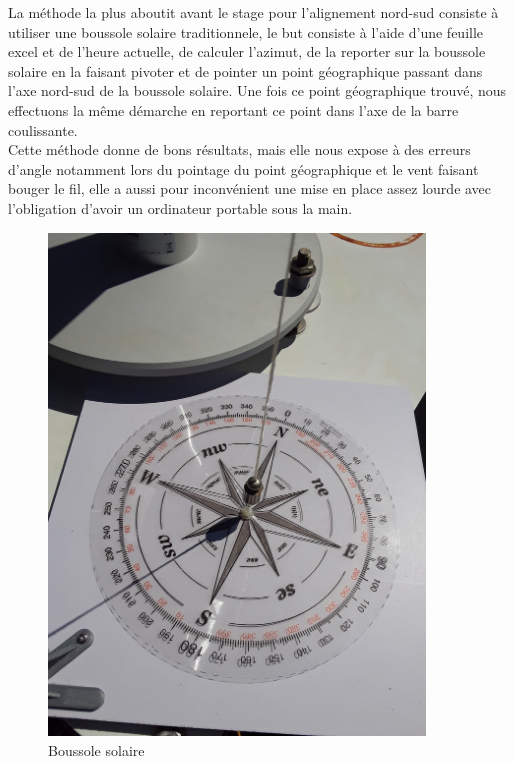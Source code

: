 \documentclass[12pt,a4paper]{article}
\begin{document}
\begin{flushleft}
La méthode la plus aboutit avant le stage pour l'alignement nord-sud consiste à utiliser une boussole solaire traditionnele, le but consiste à l'aide d'une feuille excel et de l'heure actuelle, de calculer l'azimut, de la reporter sur la boussole solaire en la faisant pivoter et de pointer un point géographique passant dans l'axe nord-sud de la boussole solaire. Une fois ce point géographique trouvé, nous effectuons la même démarche en reportant ce point dans l'axe de la barre coulissante.\\

Cette méthode donne de bons résultats, mais elle nous expose à des erreurs d'angle notamment lors du pointage du point géographique et le vent faisant bouger le fil, elle a aussi pour inconvénient une mise en place assez lourde avec l'obligation d'avoir un ordinateur portable sous la main.\\	

\begin{figure}[H]
\centering
\includegraphics[width=10cm, angle=-90]{image/montage/5.jpg} 
\caption{Boussole solaire}
\end{figure}


\end{flushleft}
\end{document}
